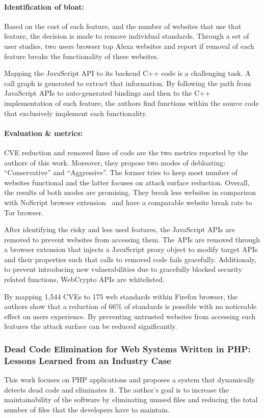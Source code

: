 \paragraph{Identification of bloat:} Based on the cost of each feature, and the number of websites that use that feature, the decision is made to remove individual standards. Through a set of user studies, two users browser top Alexa websites and report if removal of each feature breaks the functionality of these websites.

Mapping the JavaScript API to its backend C++ code is a challenging task. A call graph is generated to extract that information. By following the path from JavaScript APIs to auto-generated bindings and then to the C++ implementation of each feature, the authors find functions within the source code that exclusively implement each functionality.
 \paragraph{Evaluation \& metrics:} CVE reduction and removed lines of code are the two metrics reported by the authors of this work. Moreover, they propose two modes of debloating: ``Conservative'' and ``Aggressive''. The former tries to keep most number of websites functional and the latter focuses on attack surface reduction. Overall, the results of both modes are promising. They break less websites in comparison with NoScript browser extension~\cite{noscript} and have a comparable website break rate to Tor browser.

After identifying the risky and less used features, the JavaScript APIs are removed to prevent websites from accessing them. The APIs are removed through a browser extension that injects a JavaScript proxy object to modify target APIs and their properties such that
calls to removed code fails gracefully. Additionaly, to prevent introducing new vulnerabilities due to gracefully blocked security related functions, WebCrypto APIs are whitelisted.


By mapping 1,544 CVEs to 175 web standards within Firefox browser, the authors show that a reduction of 66\% of standards is possible with no noticeable effect on users experience. By preventing untrusted websites from accessing such features the attack surface can be reduced significantly.

\subsubsection{Dead Code Elimination for Web Systems Written in PHP: Lessons Learned from an Industry Case}
This work focuses on PHP applications and proposes a system that dynamically detects dead code and eliminates it. The author's goal is to increase the maintainability of the software by eliminating unused files and reducing the total number of files that the developers have to maintain.
